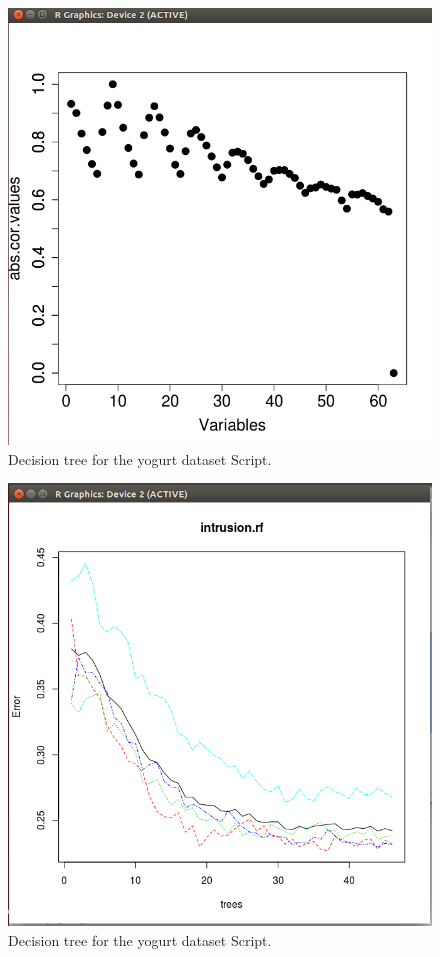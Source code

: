 \documentclass[12pt, letterpaper]{article}
\begin{document}
\begin{figure}[H]
\centering
\includegraphics[width=5.0in]{yogurtplot3}
\caption{Decision tree for the yogurt dataset Script.}
\label{fig:dtyd}
\end{figure}

\begin{figure}[H]
\centering
\includegraphics[width=5.0in]{yogurtplot5}
\caption{Decision tree for the yogurt dataset Script.}
\label{fig:dtyd}
\end{figure}
\end{document}
